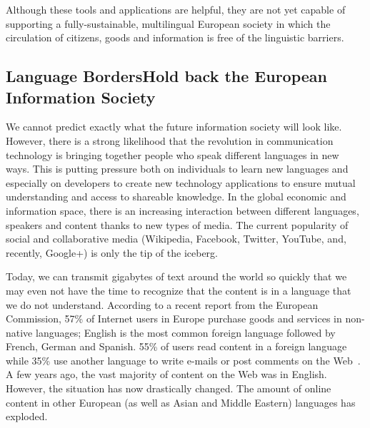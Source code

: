 \begin{multicols}{2}
Although these tools and applications are helpful, they are not yet capable of supporting a fully-sustainable, multilingual European society in which the circulation of citizens, goods and information is free of the linguistic barriers.

\subsection[Language Borders Hold back the European Information Society]{Language Borders\newline Hold back the European Information Society}

We cannot predict exactly what the future information society will look like. However, there is a strong likelihood that the revolution in communication technology is bringing together people who speak different languages in new ways. This is putting pressure both on individuals to learn new languages and especially on developers to create new technology applications to ensure mutual understanding and access to shareable knowledge. In the global economic and information space, there is an increasing interaction between different languages, speakers and content thanks to new types of media. The current popularity of social and collaborative media (Wikipedia, Facebook, Twitter, YouTube, and, recently, Google+) is only the tip of the iceberg.


Today, we can transmit gigabytes of text around the world so quickly that we may even not have the time to recognize that the content is in a language that we do not understand. According to a recent report from the European Commission, 57\% of Internet users in Europe purchase goods and services in non-native languages; English is the most common foreign language followed by French, German and Spanish. 55\% of users read content in a foreign language while 35\% use another language to write e-mails or post comments on the Web~\cite{Eurobarometer313}. A few years ago, the vast majority of content on the Web was in English. However, the situation has now drastically changed. The amount of online content in other European (as well as Asian and Middle Eastern) languages has exploded.



\end{multicols}
